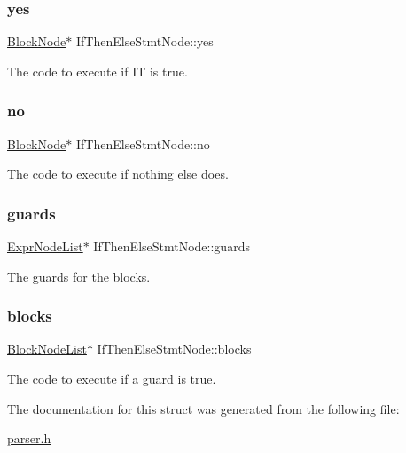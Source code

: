 \subsubsection{\texorpdfstring{yes}{yes}}
{\footnotesize\ttfamily \hyperlink{struct_block_node}{Block\+Node}$\ast$ If\+Then\+Else\+Stmt\+Node\+::yes}

The code to execute if {\ttfamily IT} is true. \mbox{\label{struct_if_then_else_stmt_node_aeb7d6e0fb8dad0d6e894bcdc887306fe}} 
\subsubsection{\texorpdfstring{no}{no}}
{\footnotesize\ttfamily \hyperlink{struct_block_node}{Block\+Node}$\ast$ If\+Then\+Else\+Stmt\+Node\+::no}

The code to execute if nothing else does. \mbox{\label{struct_if_then_else_stmt_node_ad94295fb6d16e9815a85e0d8e930f079}} 
\subsubsection{\texorpdfstring{guards}{guards}}
{\footnotesize\ttfamily \hyperlink{struct_expr_node_list}{Expr\+Node\+List}$\ast$ If\+Then\+Else\+Stmt\+Node\+::guards}

The guards for the {\ttfamily blocks}. \mbox{\label{struct_if_then_else_stmt_node_ab4b9831a1e7db13c206997a45ee84a95}} 
\subsubsection{\texorpdfstring{blocks}{blocks}}
{\footnotesize\ttfamily \hyperlink{struct_block_node_list}{Block\+Node\+List}$\ast$ If\+Then\+Else\+Stmt\+Node\+::blocks}

The code to execute if a guard is true. 

The documentation for this struct was generated from the following file\+:\begin{DoxyCompactItemize}
\item 
\hyperlink{parser_8h}{parser.\+h}\end{DoxyCompactItemize}
